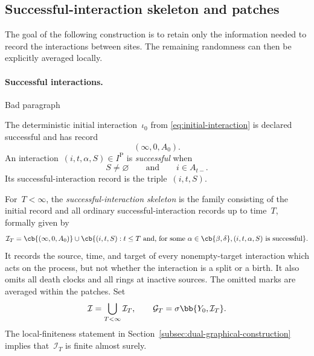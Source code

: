 \subsection{Successful-interaction skeleton and patches}
\label{sec:patches}

 The goal of the following construction is to retain only the information needed to record
the interactions between sites. The remaining randomness can then be explicitly averaged locally.

\paragraph{Successful interactions.}{\color{red} Bad paragraph}
\label{subsec:successful-skeleton}

\begin{definition}
\label{def:successful-interaction}
The deterministic initial interaction~$\iota_0$ from
\eqref{eq:initial-interaction} is declared successful and has record
\begin{equation*}
(\infty,0,A_0).
\end{equation*}
An interaction~$(i,t,\alpha,S)\in I^{\mathrm P}$ is
\emph{successful} when
\begin{equation*}
S\neq\varnothing
\qquad\text{and}\qquad
i\in A_{t-}.
\end{equation*}
Its successful-interaction record is the triple~$(i,t,S)$.
\end{definition}

For~$T<\infty$, the \emph{successful-interaction skeleton} is
the family consisting of the initial record and all ordinary
successful-interaction records up to time~$T$, formally given by
\begin{equation*}
\mathcal I_T
=
\cb{(\infty,0,A_0)}
\cup
\cb{(i,t,S):t\leq T\text{ and, for some }\alpha\in\cb{\beta,\delta},
(i,t,\alpha,S)\text{ is successful}}.
\end{equation*}
It records the source, time, and
target of every nonempty-target interaction which acts on the process, but not
whether the interaction is a split or a birth. It also omits all death clocks
and all rings at inactive sources. The omitted marks are averaged within the
patches. Set
\begin{equation*}
\mathcal I=\bigcup_{T<\infty}\mathcal I_T,
\qquad
\mathcal G_T=\sigma\bb{Y_0,\mathcal I_T}.
\end{equation*}
The local-finiteness statement in
Section~\ref{subsec:dual-graphical-construction} implies that~$\mathcal I_T$ is
finite almost surely.

